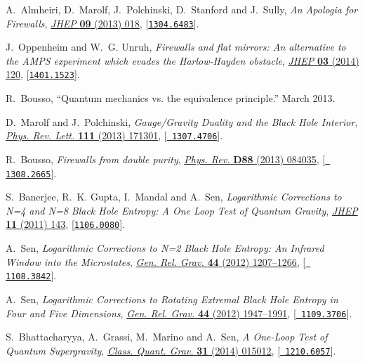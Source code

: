 \documentclass[10pt]{article}
\begin{document}
\begin{thebibliography}{100}
A.~Almheiri, D.~Marolf, J.~Polchinski, D.~Stanford and J.~Sully, \emph{{An
  Apologia for Firewalls}},
  \href{http://dx.doi.org/10.1007/JHEP09(2013)018}{\emph{JHEP} {\bf 09} (2013)
  018}, [\href{http://arxiv.org/abs/1304.6483}{{\tt 1304.6483}}].

J.~Oppenheim and W.~G. Unruh, \emph{{Firewalls and flat mirrors: An alternative
  to the AMPS experiment which evades the Harlow-Hayden obstacle}},
  \href{http://dx.doi.org/10.1007/JHEP03(2014)120}{\emph{JHEP} {\bf 03} (2014)
  120}, [\href{http://arxiv.org/abs/1401.1523}{{\tt 1401.1523}}].

R.~Bousso, ``Quantum mechanics vs. the equivalence principle.'' March 2013.

D.~Marolf and J.~Polchinski, \emph{{Gauge/Gravity Duality and the Black Hole
  Interior}},
  \href{http://dx.doi.org/10.1103/PhysRevLett.111.171301}{\emph{Phys. Rev.
  Lett.} {\bf 111} (2013) 171301}, [\href{http://arxiv.org/abs/1307.4706}{{\tt
  1307.4706}}].

R.~Bousso, \emph{{Firewalls from double purity}},
  \href{http://dx.doi.org/10.1103/PhysRevD.88.084035}{\emph{Phys. Rev.} {\bf
  D88} (2013) 084035}, [\href{http://arxiv.org/abs/1308.2665}{{\tt
  1308.2665}}].

S.~Banerjee, R.~K. Gupta, I.~Mandal and A.~Sen, \emph{{Logarithmic Corrections
  to N=4 and N=8 Black Hole Entropy: A One Loop Test of Quantum Gravity}},
  \href{http://dx.doi.org/10.1007/JHEP11(2011)143}{\emph{JHEP} {\bf 11} (2011)
  143}, [\href{http://arxiv.org/abs/1106.0080}{{\tt 1106.0080}}].

A.~Sen, \emph{{Logarithmic Corrections to N=2 Black Hole Entropy: An Infrared
  Window into the Microstates}},
  \href{http://dx.doi.org/10.1007/s10714-012-1336-5}{\emph{Gen. Rel. Grav.}
  {\bf 44} (2012) 1207--1266}, [\href{http://arxiv.org/abs/1108.3842}{{\tt
  1108.3842}}].

A.~Sen, \emph{{Logarithmic Corrections to Rotating Extremal Black Hole Entropy
  in Four and Five Dimensions}},
  \href{http://dx.doi.org/10.1007/s10714-012-1373-0}{\emph{Gen. Rel. Grav.}
  {\bf 44} (2012) 1947--1991}, [\href{http://arxiv.org/abs/1109.3706}{{\tt
  1109.3706}}].

S.~Bhattacharyya, A.~Grassi, M.~Marino and A.~Sen, \emph{{A One-Loop Test of
  Quantum Supergravity}},
  \href{http://dx.doi.org/10.1088/0264-9381/31/1/015012}{\emph{Class. Quant.
  Grav.} {\bf 31} (2014) 015012}, [\href{http://arxiv.org/abs/1210.6057}{{\tt
  1210.6057}}].


\end{thebibliography}
\end{document}
